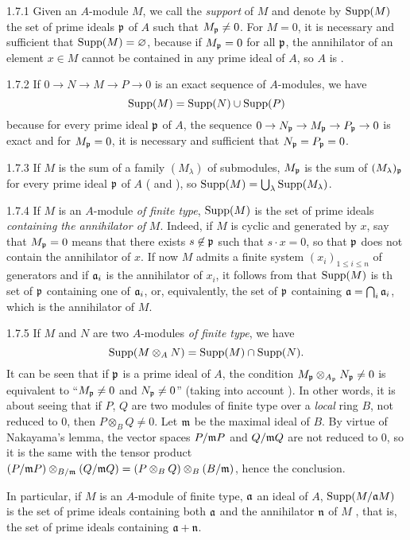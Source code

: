 \documentclass[../main.tex]{subfiles}
\begin{document}
\begin{env}{1.7.1}
Given an $A$-module $M$, we call the \emph{support} of $M$ and denote by $\operatorname{Supp}(M)$
the set of prime ideals $\mathfrak{p}$ of $A$ such that $M_\mathfrak{p}\neq 0$. For $M=0$, it
is necessary and sufficient that $\operatorname{Supp}(M)=\varnothing$, because if $M_\mathfrak{p}=0$ for all
$\mathfrak{p}$, the annihilator of an element $x\in M$ cannot be contained in any prime
ideal of $A$, so $A$ is .
\end{env}

\begin{env}{1.7.2}
If $0\to N\to M\to P\to 0$ is an exact sequence of $A$-modules, we have
\[
  \operatorname{Supp}(M)=\operatorname{Supp}(N)\cup\operatorname{Supp}(P)
\]
because for every prime ideal $\mathfrak{p}$ of $A$, the sequence
${0\to N_\mathfrak{p}\to M_\mathfrak{p}\to P_\mathfrak{p}\to 0}$ is exact  and for
$M_\mathfrak{p}=0$, it is necessary and sufficient that $N_\mathfrak{p}=P_\mathfrak{p}=0$.
\end{env}

\begin{env}{1.7.3}
If $M$ is the sum of a family $(M_\lambda)$ of submodules, $M_\mathfrak{p}$ is the sum
of $(M_\lambda)_\mathfrak{p}$ for every prime ideal $\mathfrak{p}$ of $A$ ( and ),
so $\operatorname{Supp}(M)=\bigcup_\lambda\operatorname{Supp}(M_\lambda)$.
\end{env}

\begin{env}{1.7.4}
If $M$ is an $A$-module \emph{of finite type}, $\operatorname{Supp}(M)$ is the set of prime
ideals \emph{containing the annihilator of} $M$. Indeed, if $M$ is cyclic and
generated by $x$, say that $M_\mathfrak{p}=0$ means that there exists $s\not\in\mathfrak{p}$
such that $s\cdot x=0$, so that $\mathfrak{p}$ does not contain the annihilator of $x$.
If now $M$ admits a finite system $(x_i)_{1\leq i\leq n}$ of generators and if
$\mathfrak{a}_i$ is the annihilator of $x_i$, it follows from  that $\operatorname{Supp}(M)$
is th set of $\mathfrak{p}$ containing one of $\mathfrak{a}_i$, or, equivalently, the
set of $\mathfrak{p}$ containing $\mathfrak{a}=\bigcap_i\mathfrak{a}_i$, which is the annihilator
of $M$.
\end{env}

\begin{env}{1.7.5}
If $M$ and $N$ are two $A$-modules \emph{of finite type}, we have
\[
  \operatorname{Supp}(M\otimes_A N)=\operatorname{Supp}(M)\cap\operatorname{Supp}(N).
\]
It can be seen that if $\mathfrak{p}$ is a prime ideal of $A$, the condition
$M_\mathfrak{p}\otimes_{A_\mathfrak{p}}N_\mathfrak{p}\neq 0$ is equivalent to
``$M_\mathfrak{p}\neq 0$ and $N_\mathfrak{p}\neq 0$'' (taking into account ). In
other words, it is about seeing that if $P$, $Q$ are two modules of finite type
over a \emph{local} ring $B$, not reduced to $0$, then $P\otimes_B Q\neq 0$. Let
$\mathfrak{m}$ be the maximal ideal of $B$. By virtue of Nakayama's lemma, the vector
spaces $P/\mathfrak{m}P$ and $Q/\mathfrak{m}Q$ are not reduced to $0$, so it is the same with
the tensor product
$(P/\mathfrak{m}P)\otimes_{B/\mathfrak{m}}(Q/\mathfrak{m}Q)=(P\otimes_B Q)\otimes_B(B/\mathfrak{m})$,
hence the conclusion.

In particular, if $M$ is an $A$-module of finite type, $\mathfrak{a}$ an ideal of $A$,
$\operatorname{Supp}(M/\mathfrak{a}M)$ is the set of prime ideals containing both $\mathfrak{a}$ and the
annihilator $\mathfrak{n}$ of $M$ , that is, the set of prime ideals containing
$\mathfrak{a}+\mathfrak{n}$.
\end{env}
\end{document}
